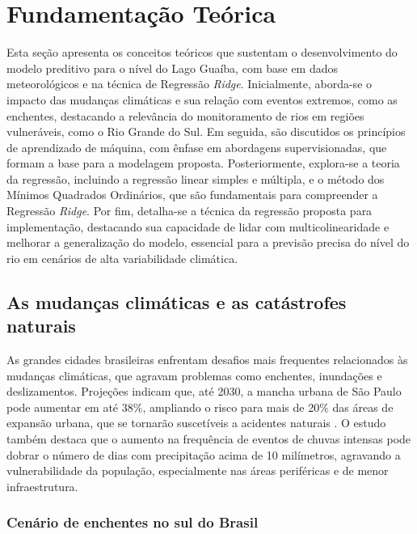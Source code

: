 \chapter{Fundamentação Teórica}\label{cap:fundamentacaoTeorica}
Esta seção apresenta os conceitos teóricos que sustentam o desenvolvimento do modelo preditivo para o nível do Lago Guaíba, com base em dados meteorológicos e na técnica de Regressão \textit{Ridge}. Inicialmente, aborda-se o impacto das mudanças climáticas e sua relação com eventos extremos, como as enchentes, destacando a relevância do monitoramento de rios em regiões vulneráveis, como o Rio Grande do Sul. Em seguida, são discutidos os princípios de aprendizado de máquina, com ênfase em abordagens supervisionadas, que formam a base para a modelagem proposta. Posteriormente, explora-se a teoria da regressão, incluindo a regressão linear simples e múltipla, e o método dos Mínimos Quadrados Ordinários, que são fundamentais para compreender a Regressão \textit{Ridge}. Por fim, detalha-se a técnica da regressão proposta para implementação, destacando sua capacidade de lidar com multicolinearidade e melhorar a generalização do modelo, essencial para a previsão precisa do nível do rio em cenários de alta variabilidade climática.

\section{As mudanças climáticas e as catástrofes naturais}

As grandes cidades brasileiras enfrentam desafios mais frequentes relacionados às mudanças climáticas, que agravam problemas como enchentes, inundações e deslizamentos. Projeções indicam que, até 2030, a mancha urbana de São Paulo pode aumentar em até 38\%, ampliando o risco para mais de 20\% das áreas de expansão urbana, que se tornarão suscetíveis a acidentes naturais \cite{Nobre2011}. O estudo também destaca que o aumento na frequência de eventos de chuvas intensas pode dobrar o número de dias com precipitação acima de 10 milímetros, agravando a vulnerabilidade da população, especialmente nas áreas periféricas e de menor infraestrutura.

\subsection{Cenário de enchentes no sul do Brasil}

